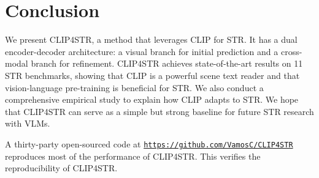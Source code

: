 \documentclass[lettersize,journal]{IEEEtran}
\begin{document}
\section{Conclusion}
We present CLIP4STR, a method that leverages CLIP for STR.
It has a dual encoder-decoder architecture: a visual branch for initial prediction and a cross-modal branch for refinement.
CLIP4STR achieves state-of-the-art results on 11 STR benchmarks, showing that CLIP is a powerful scene text reader and that vision-language pre-training is beneficial for STR.
We also conduct a comprehensive empirical study to explain how CLIP adapts to STR.
We hope that CLIP4STR can serve as a simple but strong baseline for future STR research with VLMs.

A thirty-party open-sourced code at {\color{blue}\texttt{\url{https://github.com/VamosC/CLIP4STR}}}
reproduces most of the performance of CLIP4STR. This verifies the reproducibility of CLIP4STR.




\end{document}
